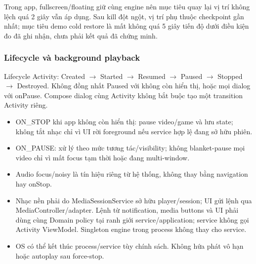 Trong app, fullscreen/floating giữ cùng engine nên mục tiêu quay lại vị trí không lệch quá 2 giây vẫn áp dụng. Sau kill đột ngột, vị trí phụ thuộc checkpoint gần nhất; mục tiêu demo cold restore là mất không quá 5 giây tiến độ dưới điều kiện đo đã ghi nhận, chưa phải kết quả đã chứng minh.

\subsubsection{Lifecycle và background playback}
\label{sec:activity-lifecycle}

Lifecycle Activity: Created \(\rightarrow\) Started \(\rightarrow\) Resumed \(\rightarrow\) Paused \(\rightarrow\) Stopped \(\rightarrow\) Destroyed. Không đồng nhất Paused với không còn hiển thị, hoặc mọi dialog với onPause. Compose dialog cùng Activity không bắt buộc tạo một transition Activity riêng.

\begin{itemize}
\item ON\_STOP khi app không còn hiển thị: pause video/game và lưu state; không tắt nhạc chỉ vì UI rời foreground nếu service hợp lệ đang sở hữu phiên.
\item ON\_PAUSE: xử lý theo mức tương tác/visibility; không blanket-pause mọi video chỉ vì mất focus tạm thời hoặc đang multi-window.
\item Audio focus/noisy là tín hiệu riêng từ hệ thống, không thay bằng navigation hay onStop.
\item Nhạc nền phải do MediaSessionService sở hữu player/session; UI gửi lệnh qua MediaController/adapter. Lệnh từ notification, media buttons và UI phải dùng cùng Domain policy tại ranh giới service/application; service không gọi Activity ViewModel. Singleton engine trong process không thay cho service.
\item OS có thể kết thúc process/service tùy chính sách. Không hứa phát vô hạn hoặc autoplay sau force-stop.
\end{itemize}

